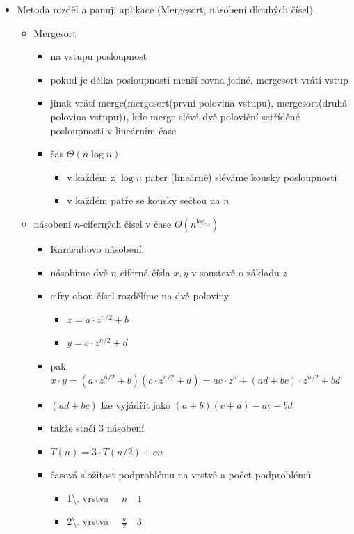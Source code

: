 \begin{itemize}
\begin{itemize}
\begin{itemize}
\item $T(n)=\Theta(n^{\log_b a})$, pokud $a/b^c\gt 1$
\end{itemize}
\end{itemize}
\item Metoda rozděl a panuj: aplikace (Mergesort, násobení dlouhých čísel)
\begin{itemize}
\item Mergesort
\begin{itemize}
\item na vstupu posloupnost
\item pokud je délka posloupnosti menší rovna jedné, mergesort vrátí vstup
\item jinak vrátí merge(mergesort(první polovina vstupu), mergesort(druhá polovina vstupu)), kde merge slévá dvě poloviční setříděné posloupnosti v lineárním čase
\item čas $\Theta(n\log n)$
\begin{itemize}
\item v každém z $\log n$ pater (lineárně) sléváme kousky posloupnosti
\item v každém patře se kousky sečtou na $n$
\end{itemize}
\end{itemize}
\item násobení $n$-ciferných čísel v čase $O(n^{\log_23})$
\begin{itemize}
\item Karacubovo násobení
\item násobíme dvě $n$-ciferná čísla $x,y$ v soustavě o základu $z$
\item cifry obou čísel rozdělíme na dvě poloviny
\begin{itemize}
\item $x=a\cdot z^{n/2}+b$
\item $y=c\cdot z^{n/2}+d$
\end{itemize}
\item pak $x\cdot y=(a\cdot z^{n/2}+b)(c\cdot z^{n/2}+d)=ac\cdot z^{n}+(ad+bc)\cdot z^{n/2}+bd$
\item $(ad+bc)$ lze vyjádřit jako $(a+b)(c+d)-ac-bd$
\item takže stačí 3 násobení
\item $T(n)=3\cdot T(n/2)+cn$
\item časová složitost podproblému na vrstvě a počet podproblémů
\begin{itemize}
\item 1\textbackslash{}. vrstva $\quad n\quad1$
\item 2\textbackslash{}. vrstva $\quad\frac n2\quad3$

\end{itemize}
\end{itemize}
\end{itemize}
\end{itemize}
